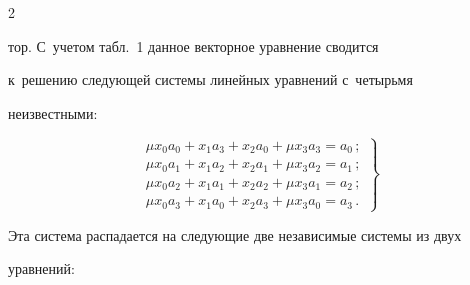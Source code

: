 \begin{multicols}{2}
\noindent


тор. С~учетом табл.~1 данное векторное уравнение   сводится 


к~решению следующей системы линейных уравнений с~четырьмя 


неизвестными:





\vspace*{1pt}





\noindent


\begin{equation}


\left.


\begin{array}{l}


\mu x_0 a_0 +x_1a_3 +x_2a_0+\mu x_3a_3=a_0\,;\\[3pt]


\mu x_0 a_1+x_1a_2+x_2a_1+\mu x_3a_2=a_1\,;\\[3pt]


\mu x_0a_2+x_1a_1+x_2a_2+\mu x_3a_1=a_2\,;\\[3pt]


\mu x_0 a_3+x_1a_0 +x_2 a_3 +\mu x_3a_0=a_3\,.


\end{array}


\right\}


\label{e6-f}


\end{equation}





\vspace*{-1pt}





  Эта система распадается на следующие две независимые системы из двух 


уравнений:





\vspace*{1pt}





\noindent


  \begin{equation}


  \left.


  \begin{array}{l}



\end{array}
\end{equation}
\end{multicols}
